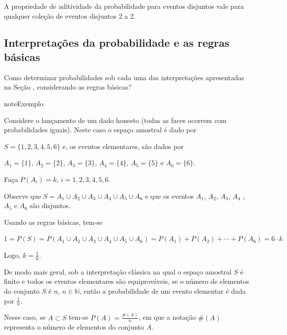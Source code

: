 A propriedade de aditividade da probabilidade para eventos disjuntos vale para qualquer coleção de eventos disjuntos 2 a 2.


\subsection{Interpretações da probabilidade e as regras básicas}
\label{\detokenize{PE511-4:interpretacoes-da-probabilidade-e-as-regras-basicas}}
Como determinar probabilidades sob cada uma das interpretações apresentadas na Seção {\hyperref[\detokenize{PE511-1:sec-interpretacoes}]{}}, considerando as regras básicas?


\begin{sphinxadmonition}{note}{Exemplo}

Considere o lançamento de um dado honesto (todas as faces ocorrem com probabilidades iguais). Neste caso o espaço amostral é dado por

\(S=\{ 1,2,3,4,5,6\}\) e, os eventos elementares, são dados por

\(A_1=\{1\}\), \(A_2=\{2\}\), \(A_3=\{3\}\), \(A_4=\{4\}\), \(A_5=\{5\}\) e \(A_6=\{6\}\).

Faça \(P(A_i)=k\), \(i=1,2,3,4,5,6\).

Observe que \(S=A_1\cup A_2\cup A_3\cup A_4\cup A_5 \cup A_6\) e que os eventos \(A_1\), \(A_2\), \(A_3\), \(A_4\) , \(A_5\) e \(A_6\) são disjuntos.

Usando as regras básicas, tem-se

\(1=P(S)=P(A_1\cup A_2\cup A_3\cup A_4\cup A_5 \cup A_6)=P(A_1)+P(A_2)+\cdots +P(A_6)=6\cdot k\)

Logo, \(k=\frac{1}{6}\).
\end{sphinxadmonition}

De modo mais geral, sob a interpretação clássica na qual o espaço amostral \(S\) é finito e todos os eventos elementares são equiprováveis, se o número de elementos do conjunto \(S\) é \(n\), \(n\in \mathbb{N}\), então a probabilidade de um evento elementar é dada por \(\frac{1}{n}\).

Nesse caso, se \(A\subset S\) tem-se \(P(A)=\frac{\#(A)}{n}\), em que a notação \(\#(A)\) representa o número de elementos do conjunto \(A\).

